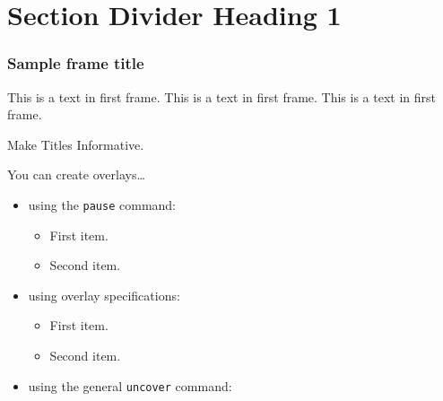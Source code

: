 \documentclass[handout]{beamer} 	%
\begin{document}


\section{Section Divider Heading 1}
\begin{frame}
  \sectionpage
\end{frame}


\begin{frame}
\frametitle{Sample frame title}
This is a text in first frame. This is a text in first frame. This is a text in first frame.
\end{frame}


\begin{frame}{Make Titles Informative.}

  You can create overlays\dots
  \begin{itemize}
  \item using the \texttt{pause} command:
    \begin{itemize}
    \item
      First item.
      \pause
    \item    
      Second item.
    \end{itemize}
  \item
    using overlay specifications:
    \begin{itemize}
    \item<3->
      First item.
    \item<4->
      Second item.
    \end{itemize}
  \item
    using the general \texttt{uncover} command:
    \begin{itemize}
    \end{itemize}
  \end{itemize}
\end{frame}
\end{document}
